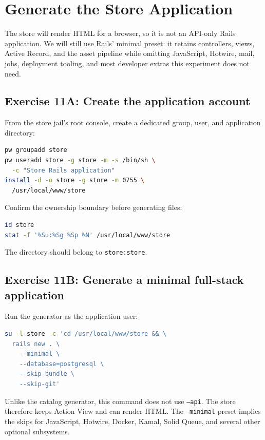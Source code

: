 \chapter{Generate the Store Application}

The store will render HTML for a browser, so it is not an API-only Rails
application. We will still use Rails' minimal preset: it retains controllers,
views, Active Record, and the asset pipeline while omitting JavaScript,
Hotwire, mail, jobs, deployment tooling, and most developer extras this
experiment does not need.

\section{Exercise 11A: Create the application account}

From the store jail's root console, create a dedicated group, user, and
application directory:

\begin{lstlisting}[language=sh]
pw groupadd store
pw useradd store -g store -m -s /bin/sh \
  -c "Store Rails application"
install -d -o store -g store -m 0755 \
  /usr/local/www/store
\end{lstlisting}

Confirm the ownership boundary before generating files:

\begin{lstlisting}[language=sh]
id store
stat -f '%Su:%Sg %Sp %N' /usr/local/www/store
\end{lstlisting}

The directory should belong to \texttt{store:store}.

\section{Exercise 11B: Generate a minimal full-stack application}

Run the generator as the application user:

\begin{lstlisting}[language=sh]
su -l store -c 'cd /usr/local/www/store && \
  rails new . \
    --minimal \
    --database=postgresql \
    --skip-bundle \
    --skip-git'
\end{lstlisting}

Unlike the catalog generator, this command does not use \texttt{--api}.
The store therefore keeps Action View and can render HTML. The
\texttt{--minimal} preset implies the skips for JavaScript, Hotwire, Docker,
Kamal, Solid Queue, and several other optional subsystems.


